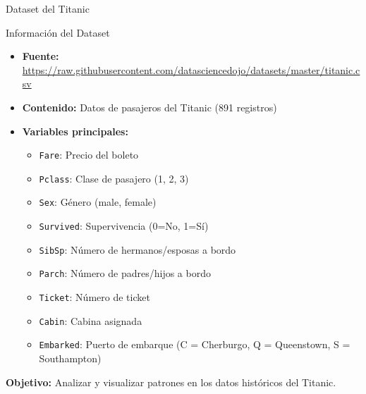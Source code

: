 \documentclass[10pt]{beamer}
\begin{document}
\begin{frame}{Dataset del Titanic}
  \begin{block}{Información del Dataset}
    \begin{itemize}
      \item \textbf{Fuente:} \url{https://raw.githubusercontent.com/datasciencedojo/datasets/master/titanic.csv}
      \item \textbf{Contenido:} Datos de pasajeros del Titanic (891 registros)
      \item \textbf{Variables principales:}
        \begin{itemize}
          \item \texttt{Fare}: Precio del boleto
          \item \texttt{Pclass}: Clase de pasajero (1, 2, 3)
          \item \texttt{Sex}: Género (male, female)
          \item \texttt{Survived}: Supervivencia (0=No, 1=Sí)
          \item \texttt{SibSp}: Número de hermanos/esposas a bordo
          \item \texttt{Parch}: Número de padres/hijos a bordo
          \item \texttt{Ticket}: Número de ticket
          \item \texttt{Cabin}: Cabina asignada
          \item \texttt{Embarked}: Puerto de embarque (C = Cherburgo, Q = Queenstown, S = Southampton)
        \end{itemize}
    \end{itemize}
  \end{block}
  \textbf{Objetivo:} Analizar y visualizar patrones en los datos históricos del Titanic.
\end{frame}
\end{document}
